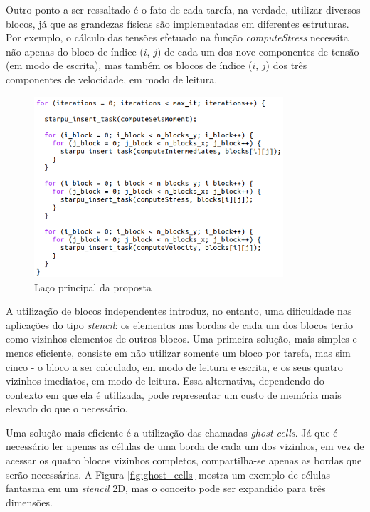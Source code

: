 \documentclass[cic,tc]{iiufrgs}
\begin{document}
Outro ponto a ser ressaltado é o fato de cada tarefa, na verdade, utilizar diversos blocos, já que as grandezas físicas são implementadas em diferentes estruturas. Por exemplo, o cálculo das
tensões efetuado na função \textit{computeStress} necessita não apenas do bloco de índice ($i$, $j$) de cada um dos nove componentes de tensão (em modo de escrita), mas também os blocos de
índice ($i$, $j$) dos três componentes de velocidade, em modo de leitura.

\begin{figure}[!htb]
    \caption{Laço principal da proposta}
    \begin{center}
      \includegraphics[width=25em]{new_main_loop}
    \end{center}
    \label{fig:new_main_loop}
\end{figure}

A utilização de blocos independentes introduz, no entanto, uma dificuldade nas aplicações do tipo \textit{stencil}: os elementos nas bordas de cada um dos blocos terão como vizinhos
elementos de outros blocos. Uma primeira solução, mais simples e menos eficiente, consiste em não utilizar somente um bloco por tarefa, mas sim cinco - o bloco a ser calculado, em
modo de leitura e escrita, e os seus quatro vizinhos imediatos, em modo de leitura. Essa alternativa, dependendo do contexto em que ela é utilizada, pode representar um custo de memória mais
elevado do que o necessário.

Uma solução mais eficiente é a utilização das chamadas \textit{ghost cells}. Já que é necessário ler apenas as células de uma borda de cada um dos vizinhos, em vez de acessar os quatro
blocos vizinhos completos, compartilha-se apenas as bordas que serão necessárias. A Figura \ref{fig:ghost_cells} mostra um exemplo de células fantasma em um \textit{stencil} 2D,
mas o conceito pode ser expandido para três dimensões.
\end{document}
